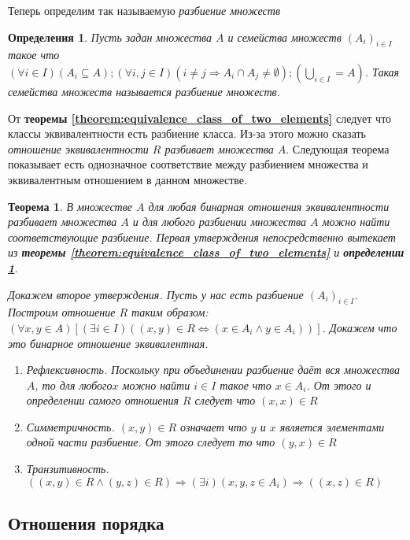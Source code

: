 \documentclass[a4paper, 16pt, oneside]{book}
\newtheorem{Definition}{Определения}[theorem]
\newtheorem{Theorem}{Теорема}[theorem]
\begin{document}
\par Теперь определим так называемую \textit{разбиение множеств}
\begin{Definition}
	\label{definiton:set_splitting}
	Пусть задан множества \(A\) и семейства множеств \((A_i)_{i \in I}\) такое что \((\forall i \in I)(A_i \subseteq A); (\forall i,j \in I)(i \ne j \Rightarrow A_i \cap A_j \ne \emptyset); (\underset{i \in I}{\bigcup} = A)\). Такая семейства множеств называется разбиение множеств.
\end{Definition}

От \textbf{теоремы \ref{theorem:equivalence_class_of_two_elements}} следует что классы эквивалентности есть разбиение класса.
Из-за этого можно сказать \textit{отношение эквивалентности \(R\) разбивает множества \(A\)}.
Следующая теорема показывает есть однозначное соответствие между разбиением множества и
эквивалентным отношением в данном множестве.
\begin{Theorem}
	\label{theorem:splitting_by_equivalence_relation}
	В множестве \(A\) для любая бинарная отношения эквивалентности разбивает множества \(A\)
	и для любого разбиении множества \(A\) можно найти соответствующие разбиение.
	\proof Первая утверждения непосредственно вытекает из \textbf{теоремы \ref{theorem:equivalence_class_of_two_elements}} и \textbf{определении \ref{definiton:set_splitting}}.
	\par Докажем второе утверждения. Пусть у нас есть разбиение \((A_i)_{i \in I}\).
	Построим отношение \(R\) таким образом:
	\((\forall x,y \in A)[(\exists i \in I)((x, y) \in R \Leftrightarrow (x \in A_i \land y \in A_i))]\).
	Докажем что это бинарное отношение эквивалентная.
	\begin{enumerate}
		\item Рефлексивность. Поскольку при объединении разбиение даёт вся множества \(A\), то для любого\(x\)
		можно найти \(i \in I\) такое что \(x \in A_i\). От этого и определении самого отношения \(R\) следует
		что \((x, x) \in R\)
		\item Симметричность. \((x, y) \in R\) означает что \(y\) и \(x\) является элементами одной части разбиение.
		От этого следует то что \((y, x) \in R\)
		\item Транзитивность. \(((x, y) \in R \land (y, z) \in R) \Rightarrow (\exists i)(x, y, z \in A_i)
		\Rightarrow ((x, z) \in R)\)
	\end{enumerate}
	\qedsymbol
\end{Theorem}

\subsection{Отношения порядка}
\end{document}
